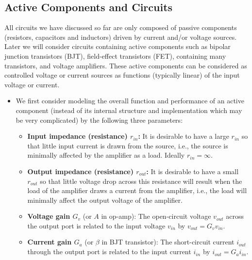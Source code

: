 \documentclass{article}
\begin{document}
\subsection*{Active Components and Circuits}

All circuits we have discussed so far are only composed of passive components 
(resistors, capacitors and inductors) driven by current and/or voltage 
sources. Later we will consider circuits containing active components such
as bipolar junction transistors (BJT), field-effect transistors (FET), 
containing many transistors, and voltage amplifiers. These active components
can be considered as controlled voltage or current sources as functions 
(typically linear) of the input voltage or current. 

\begin{itemize}
\item We first consider modeling the overall function and performance of 
  an active component (instead of its internal structure and implementation
  which may be very complicated) by the following three parameters:
  \begin{itemize}
  \item {\bf Input impedance (resistance) $r_{in}$:} It is desirable to have
    a large $r_{in}$ so that little input current is drawn from the source, 
    i.e., the source is minimally affected by the amplifier as a load. 
    Ideally $r_{in}=\infty$. 
  \item {\bf Output impedance (resistance) $r_{out}$:} It is desirable to 
    have a small $r_{out}$ so that little voltage drop across this resistance 
    will result when the load of the amplifier draws a current from the 
    amplifier, i.e., the load will minimally affect the output voltage of 
    the amplifier.
  \item {\bf Voltage gain $G_v$} (or $A$ in op-amp):
    The open-circuit voltage $v_{out}$ across the output port is related 
    to the input voltage $v_{in}$ by $v_{out}=G_v v_{in}$.
  \item {\bf Current gain $G_a$} (or $\beta$ in BJT transistor):
    The short-circuit current $i_{out}$ through the output port is related 
    to the input current $i_{in}$ by $i_{out}=G_a i_{in}$.
  \end{itemize}
  



\end{itemize}
\end{document}
